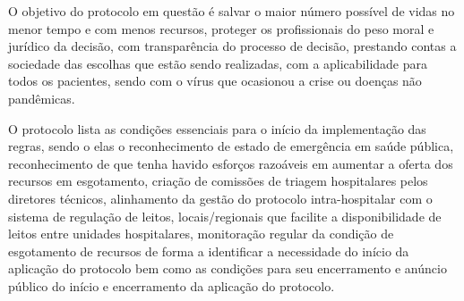 \documentclass[12pt]{article}
\begin{document}
O objetivo do protocolo em questão é salvar o maior número possível de vidas no menor tempo e com menos recursos, proteger os profissionais do peso moral e jurídico da decisão, com transparência do processo de decisão, prestando contas a sociedade das escolhas que estão sendo realizadas, com a aplicabilidade para todos os pacientes, sendo com o vírus que ocasionou a crise ou doenças não pandêmicas.

O protocolo lista as condições essenciais para o início da implementação das regras, sendo o elas o reconhecimento de estado de emergência em saúde pública, reconhecimento de que tenha havido esforços razoáveis em aumentar a oferta dos recursos em esgotamento, criação de comissões de triagem hospitalares pelos diretores técnicos, alinhamento da gestão do protocolo intra-hospitalar com o sistema de regulação de leitos, locais/regionais que facilite a disponibilidade de leitos entre unidades hospitalares, monitoração regular da condição de esgotamento de recursos de forma a identificar a necessidade do início da aplicação do protocolo bem como as condições para seu encerramento e anúncio público do início e encerramento da aplicação do protocolo.


\end{document}
